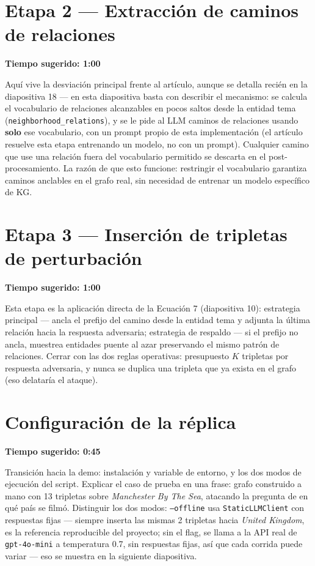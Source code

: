 \documentclass[11pt]{article}
\newcommand{\tiempo}[1]{{\small\color{timecolor}\textbf{Tiempo sugerido: #1}}\par\vspace{0.3em}}
\begin{document}
\section{Etapa 2 --- Extracción de caminos de relaciones}
\tiempo{1:00}
Aquí vive la desviación principal frente al artículo, aunque se detalla recién en la
diapositiva 18 --- en esta diapositiva basta con describir el mecanismo: se calcula el
vocabulario de relaciones alcanzables en pocos saltos desde la entidad tema
(\texttt{neighborhood\_relations}), y se le pide al LLM caminos de relaciones usando
\textbf{solo} ese vocabulario, con un prompt propio de esta implementación (el artículo
resuelve esta etapa entrenando un modelo, no con un prompt). Cualquier camino que use una
relación fuera del vocabulario permitido se descarta en el post-procesamiento. La razón de
que esto funcione: restringir el vocabulario garantiza caminos anclables en el grafo real,
sin necesidad de entrenar un modelo específico de KG.

\section{Etapa 3 --- Inserción de tripletas de perturbación}
\tiempo{1:00}
Esta etapa es la aplicación directa de la Ecuación 7 (diapositiva 10): estrategia principal
--- ancla el prefijo del camino desde la entidad tema y adjunta la última relación hacia la
respuesta adversaria; estrategia de respaldo --- si el prefijo no ancla, muestrea entidades
puente al azar preservando el mismo patrón de relaciones. Cerrar con las dos reglas
operativas: presupuesto $K$ tripletas por respuesta adversaria, y nunca se duplica una
tripleta que ya exista en el grafo (eso delataría el ataque).

\section{Configuración de la réplica}
\tiempo{0:45}
Transición hacia la demo: instalación y variable de entorno, y los dos modos de ejecución
del script. Explicar el caso de prueba en una frase: grafo construido a mano con 13
tripletas sobre \emph{Manchester By The Sea}, atacando la pregunta de en qué país se filmó.
Distinguir los dos modos: \texttt{--offline} usa \texttt{StaticLLMClient} con respuestas
fijas --- siempre inserta las mismas 2 tripletas hacia \emph{United Kingdom}, es la
referencia reproducible del proyecto; sin el flag, se llama a la API real de
\texttt{gpt-4o-mini} a temperatura 0.7, sin respuestas fijas, así que cada corrida puede
variar --- eso se muestra en la siguiente diapositiva.
\end{document}
